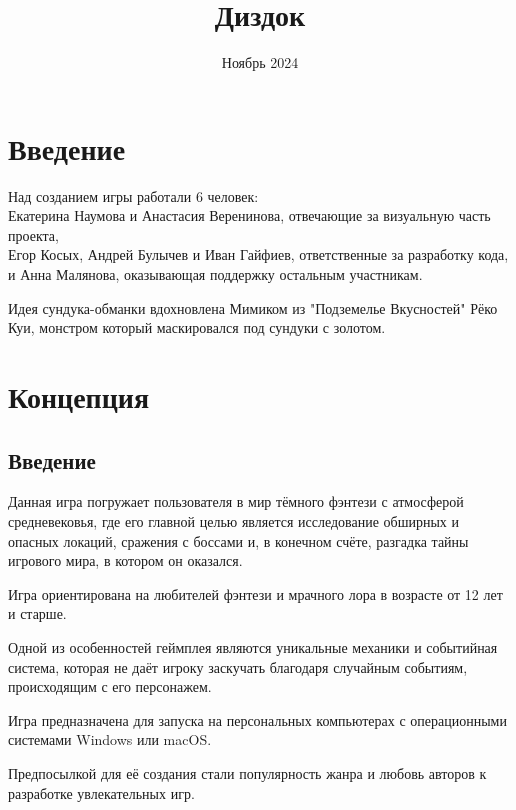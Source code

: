 \documentclass{article}
\title{Диздок}
\author{}
\date{Ноябрь 2024}
\begin{document}
\maketitle

\tableofcontents

\newpage
\section{Введение}
Над созданием игры работали 6 человек: \\
Екатерина Наумова и Анастасия Веренинова, отвечающие за визуальную часть
проекта,\\
Егор Косых, Андрей Булычев и Иван Гайфиев, ответственные за разработку кода,\\
и Анна Малянова, оказывающая поддержку остальным участникам.

Идея сундука-обманки вдохновлена Мимиком из "Подземелье Вкусностей" Рёко Куи, монстром который маскировался под сундуки с золотом.

\section{Концепция}

\subsection{Введение}
Данная игра погружает пользователя в мир тёмного фэнтези с атмосферой 
средневековья, где его главной целью является исследование обширных 
и опасных локаций, сражения с боссами и, в конечном счёте, разгадка 
тайны игрового мира, в котором он оказался. \par Игра ориентирована на любителей 
фэнтези и мрачного лора в возрасте от 12 лет и старше. \par Одной из особенностей 
геймплея являются уникальные механики и событийная система, которая не 
даёт игроку заскучать благодаря случайным событиям, происходящим с его 
персонажем. \par Игра предназначена для запуска на персональных компьютерах 
с операционными системами Windows или macOS. \par Предпосылкой для её создания стали 
популярность жанра и любовь авторов к разработке увлекательных игр.
\end{document}
